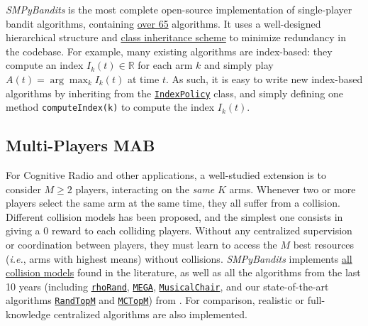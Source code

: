 \documentclass[a4paper,10pt,]{article}
\begin{document}
\emph{SMPyBandits} is the most complete open-source implementation of
single-player bandit algorithms,
containing \href{https://SMPyBandits.GitHub.io/docs/Policies.html}{over 65} algorithms.
It uses a well-designed hierarchical structure and
\href{https://SMPyBandits.GitHub.io/uml_diagrams/README.html}{class
inheritance scheme} to minimize redundancy in the codebase.
For example, many existing algorithms are index-based:
they compute an index $I_k(t)\in\mathbb{R}$ for each arm $k$ and simply play $A(t) = \arg\max_k I_k(t)$ at time $t$.
As such, it is easy to write new index-based algorithms by inheriting from the
\href{https://SMPyBandits.GitHub.io/docs/Policies.IndexPolicy.html}{\texttt{IndexPolicy}}
class, and simply defining one method \texttt{computeIndex(k)} to compute the index $I_k(t)$.


\subsection{Multi-Players MAB}\label{multi-players-mab}

For Cognitive Radio and other applications, a well-studied extension is to
consider \(M\geq2\) players, interacting on the \emph{same} \(K\) arms.
Whenever two or more players select the same arm at the same time, they
all suffer from a collision. Different collision models has been
proposed, and the simplest one consists in giving a \(0\) reward to each
colliding players. Without any centralized supervision or coordination
between players, they must learn to access the \(M\) best resources
(\emph{i.e.}, arms with highest means) without collisions.
\emph{SMPyBandits} implements
\href{https://SMPyBandits.GitHub.io/docs/Environment.CollisionModels.html}{all
collision models} found in the literature, as well as all the
algorithms from the last 10 years (including
\href{https://SMPyBandits.GitHub.io/docs/PoliciesMultiPlayers.rhoRand.html}{\texttt{rhoRand}},
\href{https://SMPyBandits.GitHub.io/docs/Policies.MEGA.html}{\texttt{MEGA}},
\href{https://SMPyBandits.GitHub.io/docs/Policies.MusicalChair.html}{\texttt{MusicalChair}}, and our state-of-the-art algorithms
\href{https://SMPyBandits.GitHub.io/docs/PoliciesMultiPlayers.RandTopM.html}{\texttt{RandTopM}}
and
\href{https://SMPyBandits.GitHub.io/docs/PoliciesMultiPlayers.MCTopM.html}{\texttt{MCTopM}})
from \citet{BessonALT2018}.
For comparison, realistic or full-knowledge centralized algorithms are also implemented.

\end{document}
